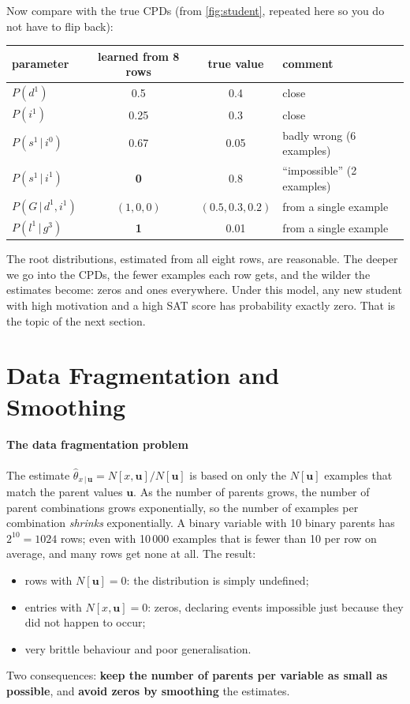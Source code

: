 \documentclass[11pt, oneside]{book}
\newcommand{\Prob}{\mathbb{P}}           %
\newcommand{\given}{\,\vert\,}           %
\let\originalsection\section
\renewcommand{\section}{\Needspace{7\baselineskip}\originalsection}
\begin{document}
Now compare with the true CPDs (from \cref{fig:student}, repeated here so you
do not have to flip back):
\begin{center}
\small
\begin{tabular}{@{}lccl@{}}
\toprule
parameter & learned from 8 rows & true value & comment \\
\midrule
$P(d^1)$ & 0.5 & 0.4 & close \\
$P(i^1)$ & 0.25 & 0.3 & close \\
$P(s^1 \given i^0)$ & 0.67 & 0.05 & badly wrong (6 examples) \\
$P(s^1 \given i^1)$ & \textbf{0} & 0.8 & ``impossible'' (2 examples) \\
$P(G \given d^1, i^1)$ & $(1, 0, 0)$ & $(0.5, 0.3, 0.2)$ & from a single example \\
$P(l^1 \given g^3)$ & \textbf{1} & 0.01 & from a single example \\
\bottomrule
\end{tabular}
\end{center}
The root distributions, estimated from all eight rows, are reasonable. The
deeper we go into the CPDs, the fewer examples each row gets, and the wilder
the estimates become: zeros and ones everywhere. Under this model, any new
student with high motivation and a high SAT score has probability exactly zero.
That is the topic of the next section.

\section{Data Fragmentation and Smoothing}
\label{sec:smoothing}

\paragraph{The data fragmentation problem} The estimate $\hat\theta_{x \given
\mathbf{u}} = N[x, \mathbf{u}] / N[\mathbf{u}]$ is based on only the
$N[\mathbf{u}]$ examples that match the parent values $\mathbf{u}$. As the
number of parents grows, the number of parent combinations grows
exponentially, so the number of examples per combination \emph{shrinks}
exponentially. A binary variable with 10 binary parents has $2^{10} = 1024$
rows; even with 10\,000 examples that is fewer than 10 per row on average, and
many rows get none at all. The result:
\begin{itemize}
  \item rows with $N[\mathbf{u}] = 0$: the distribution is simply undefined;
  \item entries with $N[x, \mathbf{u}] = 0$: zeros, declaring events impossible
    just because they did not happen to occur;
  \item very brittle behaviour and poor generalisation.
\end{itemize}
Two consequences: \textbf{keep the number of parents per variable as small as
possible}, and \textbf{avoid zeros by smoothing} the estimates.
\end{document}
